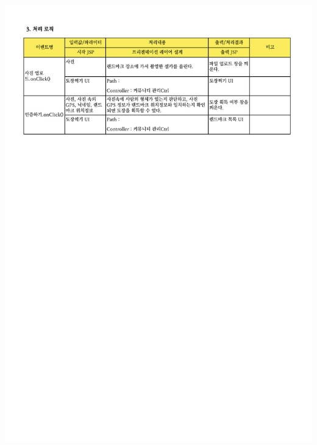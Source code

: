 {{{{{{{{{{{{{{{{{{{{{{{{{{{{{{{{{{{{{{{{{{{{{{{{{{{{{{{{{{{{{\includegraphics[width=20cm]{./Figure/Analysis/Display/community/community_20.pdf} \\
}}}}}}}}}}}}}}}}}}}}}}}}}}}}}}}}}}}}}}}}}}}}}}}}}}}}}}}}}}}}}
